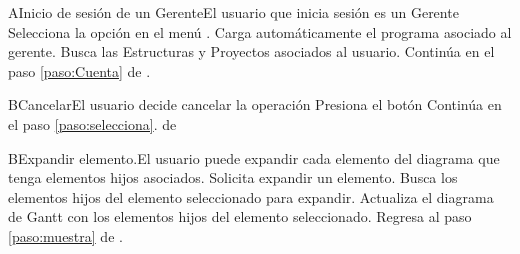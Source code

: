   \begin{UCtrayectoriaA}{A}{Inicio de sesión de un Gerente}{El usuario que inicia sesión es un Gerente}
    \UCpaso [\UCactor] Selecciona la opción  en el menú .
    \UCpaso Carga automáticamente el programa asociado al gerente.
    \UCpaso Busca las Estructuras y Proyectos asociados al usuario.
    \UCpaso Continúa en el paso \ref{paso:Cuenta} de .
  \end{UCtrayectoriaA}

  \begin{UCtrayectoriaA}{B}{Cancelar}{El usuario decide cancelar la operación}
    \UCpaso[\UCactor] Presiona el botón 
    \UCpaso Continúa en el paso \ref{paso:selecciona}. de 
  \end{UCtrayectoriaA}

  \begin{UCtrayectoriaA}{B}{Expandir elemento.}{El usuario puede expandir cada elemento del diagrama que tenga elementos hijos asociados.}
    \UCpaso[\UCactor] Solicita expandir un elemento.
    \UCpaso Busca los elementos hijos del elemento seleccionado para expandir.
    \UCpaso Actualiza el diagrama de Gantt con los elementos hijos del elemento seleccionado.
    \UCpaso Regresa al paso \ref{paso:muestra} de .
  \end{UCtrayectoriaA}